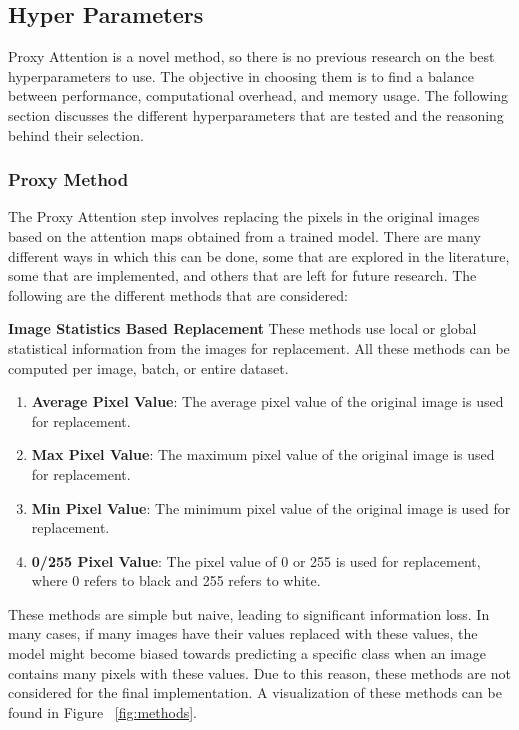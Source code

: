 \documentclass[a4paper,11pt,openright]{book}
\begin{document}
\subsection{Hyper Parameters} \label{sec:hyperparameters}
Proxy Attention is a novel method, so there is no previous research on the best hyperparameters to use. The objective in choosing them is to find a balance between performance, computational overhead, and memory usage. The following section discusses the different hyperparameters that are tested and the reasoning behind their selection.

\subsubsection{Proxy Method}
The Proxy Attention step involves replacing the pixels in the original images based on the attention maps obtained from a trained model. There are many different ways in which this can be done, some that are explored in the literature, some that are implemented, and others that are left for future research. The following are the different methods that are considered:

\textbf{Image Statistics Based Replacement}
These methods use local or global statistical information from the images for replacement. All these methods can be computed per image, batch, or entire dataset.

\begin{enumerate}
    \item \textbf{Average Pixel Value}: The average pixel value of the original image is used for replacement.
    \item \textbf{Max Pixel Value}: The maximum pixel value of the original image is used for replacement.
    \item \textbf{Min Pixel Value}: The minimum pixel value of the original image is used for replacement.
    \item \textbf{0/255 Pixel Value}: The pixel value of 0 or 255 is used for replacement, where 0 refers to black and 255 refers to white.
\end{enumerate}
These methods are simple but naive, leading to significant information loss. In many cases, if many images have their values replaced with these values, the model might become biased towards predicting a specific class when an image contains many pixels with these values.
Due to this reason, these methods are not considered for the final implementation. A visualization of these methods can be found in Figure ~\ref{fig:methods}.
\end{document}
